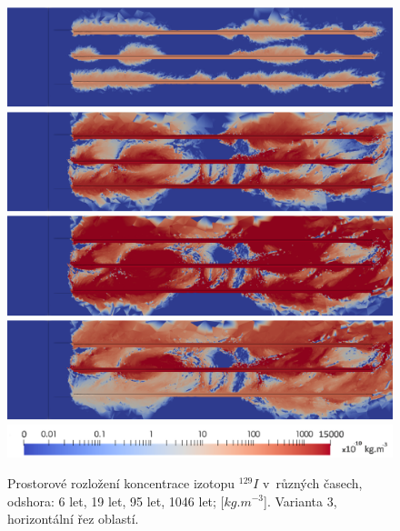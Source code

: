 \documentclass[11pt,a4paper]{article}
\begin{document}
\begin{onehalfspacing}
\begin{figure}[H]
\centering
\includegraphics[width=16cm]{graphics/obr_ralek/var3/04_6y.png}
\includegraphics[width=16cm]{graphics/obr_ralek/var3/06_19y.png}
\includegraphics[width=16cm]{graphics/obr_ralek/var3/07_95y.png}
\includegraphics[width=16cm]{graphics/obr_ralek/var3/13_1046y.png}
\includegraphics[width=16cm]{graphics/obr_ralek/var3/skala_nek_zdroj_vypnuti.png}   
\caption{Prostorové rozložení koncentrace izotopu $^{129}I$ v~různých časech, odshora: 6 let, 19 let, 95 let, 1046 let; [$kg.m^{-3}$]. Varianta 3, horizontální řez oblastí.}
\label{var3}
\end{figure}


\end{onehalfspacing}
\end{document}
